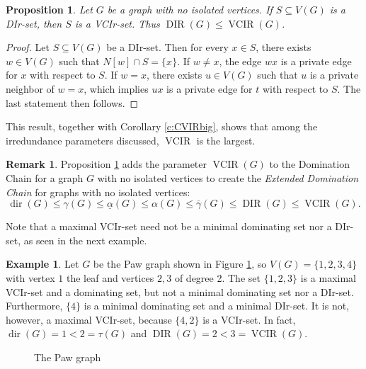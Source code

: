 \documentclass{article}
\numberwithin{figure}{section}
\numberwithin{table}{section}
\numberwithin{equation}{section}
\newtheorem{prop}[thm]{Proposition}
\theoremstyle{definition}
\newtheorem{rem}[thm]{Remark}
\theoremstyle{definition}
\theoremstyle{definition}
\newtheorem{ex}[thm]{Example}
\newcommand{\bpf}{\begin{proof}}
\newcommand{\epf}{\end{proof}\ms}
\newcommand{\ms}{\medskip}
\newcommand{\ol}{\overline}
\newcommand{\vc}{\tau}
\DeclareMathOperator{\dir}{dir}
\DeclareMathOperator{\DIR}{DIR}
\DeclareMathOperator{\VCIR}{VCIR}
\begin{document}
\begin{prop}\label{p:VCIrandDir} 
 Let $G$ be a graph with no isolated vertices. If $S \subseteq V(G)$ is a DIr-set, then $S$ is a VCIr-set. Thus $\DIR(G)\le\VCIR(G)$.
\end{prop}

\bpf 
Let $S \subseteq V(G)$ be a DIr-set. Then for every $x \in S$, there exists $w \in V(G)$ such that $N[w] \cap S = \{x\}$. If $w \neq x$, the edge $wx$ is a private edge for $x$ with respect to $S$. If $w=x$, there exists $u \in V(G)$ such that  $u$ is a private neighbor of $w=x$, which implies $ux$ is a private edge for $t$ with respect to $S$.  The last statement then follows.
\epf

This result, together with Corollary \ref{c:CVIRbig},  shows that among the irredundance parameters discussed, $\VCIR$ is the largest.
\begin{rem} \label{r:ExtDomChain}
      Proposition \ref{p:VCIrandDir} adds the parameter $\VCIR(G)$ to the Domination Chain  for a graph $G$ with no isolated vertices  to create the \emph{Extended Domination Chain} for graphs with no isolated vertices:
 \[\dir(G) \leq \gamma(G) \leq \underline{\alpha}(G) \leq \alpha(G) \leq \ol{\gamma}(G) \leq \DIR(G) \leq \VCIR(G).\]
\end{rem}

Note that a maximal VCIr-set need not be a minimal dominating set nor a DIr-set, as seen in the next example.

\begin{ex}\label{ex:VC-paw}
    Let $G$ be the Paw graph shown in Figure \ref{f:paw}, so $V(G)=\{1,2,3,4\}$ with vertex $1$ the leaf and vertices $2,3$ of degree 2.  The set $\{1,2,3\}$ is a maximal VCIr-set and a dominating set, but not a minimal dominating set nor a DIr-set.  Furthermore, $\{4\}$ is a minimal dominating set and  a minimal DIr-set.   It is not, however, a maximal VCIr-set, because $\{4,2\}$ is a VCIr-set.  In fact, $\dir(G)=1<2=\vc(G)$ and $\DIR(G)=2<3=\VCIR(G)$.

\begin{figure}[!h]
\centering
{}
\caption{\label{f:paw} The Paw graph} 
\end{figure}

\end{ex}
\end{document}

